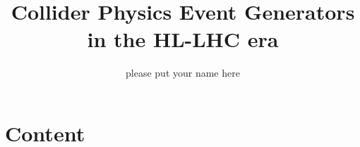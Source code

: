 \documentclass{article}
\title{Collider Physics Event Generators in the HL-LHC era}
\author{please put your name here}
\begin{document}
\maketitle

\section{Content}
\end{document}
